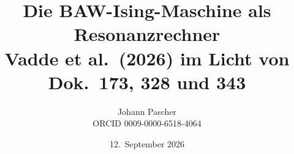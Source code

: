 \documentclass[11pt,a4paper]{report}
\title{Die BAW-Ising-Maschine als Resonanzrechner\\[0.5em]
  \large Vadde et al.\ (2026) im Licht von Dok.~173, 328 und 343}
\date{12.~September 2026}
\author{Johann Pascher\\\small ORCID 0009-0000-6518-4064}
\begin{document}
\renewcommand{\thechapter}{}
\renewcommand{\thesection}{\arabic{section}}
\maketitle
\tableofcontents

\end{document}
